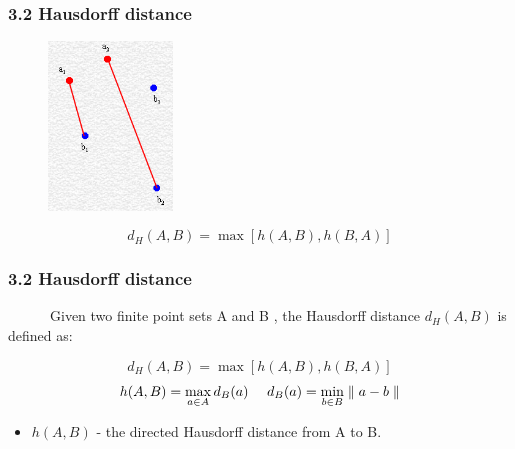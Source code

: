 \documentclass[notheorems,serif,table,compress]{beamer}  %
\begin{document}
\begin{frame}
\frametitle{3.2 Hausdorff distance}

   \begin{figure}[!ht]
    \centering
    \includegraphics[width=1.3in]{dian3.png}
   \end{figure}
\begin{displaymath}
d_{H}(A,B)=\max[h(A,B),h(B,A)]
\end{displaymath}
\end{frame}

\begin{frame}
\frametitle{3.2 Hausdorff distance}
~~~~~~Given two finite point sets A and B , the Hausdorff distance $d_{H}(A,B)$ is defined as:
\begin{tcolorbox}[colback=red!5,colframe=blue!75!black]
\begin{displaymath}
d_{H}(A,B)=\max[h(A,B),h(B,A)]
\end{displaymath}
\begin{displaymath}
h(A,B)=\max_{\begin{subarray}{l}
              a\in A
               \end{subarray}}
       d_{B}(a)
~~~~
d_{B}(a)=\min_{\begin{subarray}{l}
              b\in B
               \end{subarray}}
        \parallel a-b \parallel
\end{displaymath}
\begin{itemize}
    \item $h(A,B)$ - the directed Hausdorff distance from A to B.
\end{itemize}
\end{tcolorbox}
\end{frame}

\end{document}
